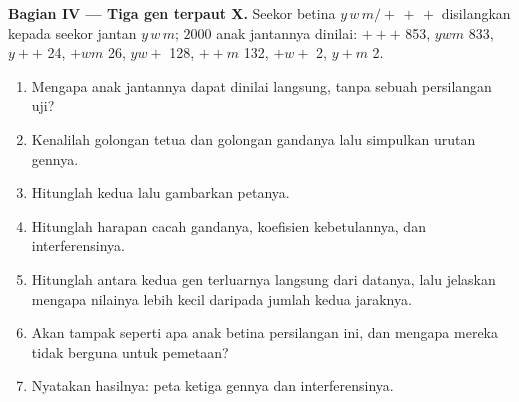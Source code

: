 \begin{problem}
\medskip
\noindent\textbf{Bagian IV --- Tiga gen terpaut X.}
Seekor betina $y\,w\,m/+\,+\,+$ disilangkan kepada seekor jantan
$y\,w\,m$; $2000$ anak jantannya dinilai: $+++$ 853, $ywm$ 833, $y++$
24, $+wm$ 26, $yw+$ 128, $++m$ 132, $+w+$ 2, $y+m$ 2.
\begin{enumerate}[resume]
  \item Mengapa anak jantannya dapat dinilai langsung, tanpa sebuah
        persilangan uji?
  \item Kenalilah golongan tetua dan golongan  gandanya
        lalu simpulkan urutan gennya.
  \item Hitunglah kedua  lalu gambarkan petanya.
  \item Hitunglah harapan cacah  gandanya, koefisien
        kebetulannya, dan interferensinya.
  \item Hitunglah  antara kedua gen terluarnya
        langsung dari datanya, lalu jelaskan mengapa nilainya lebih
        kecil daripada jumlah kedua jaraknya.
  \item Akan tampak seperti apa anak betina persilangan ini, dan
        mengapa mereka tidak berguna untuk pemetaan?
  \item Nyatakan hasilnya: peta ketiga gennya dan interferensinya.
\end{enumerate}
\end{problem}
